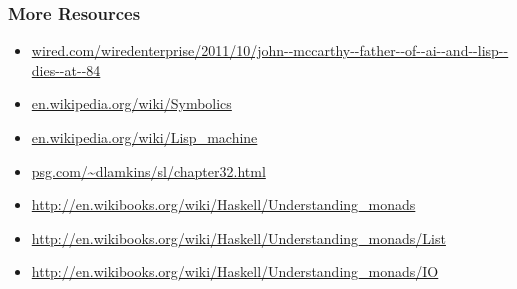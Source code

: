 \documentclass[]{beamer}
\begin{document}
\begin{frame}[fragile]
  \frametitle{More Resources}

  \begin{itemize}    
  \item \url{wired.com/wiredenterprise/2011/10/john--mccarthy--father--of--ai--and--lisp--dies--at--84}
  \item \url{en.wikipedia.org/wiki/Symbolics}
  \item \url{en.wikipedia.org/wiki/Lisp_machine}
  \item \url{psg.com/~dlamkins/sl/chapter32.html}
  \item \url{http://en.wikibooks.org/wiki/Haskell/Understanding_monads}
  \item \url{http://en.wikibooks.org/wiki/Haskell/Understanding_monads/List}
  \item \url{http://en.wikibooks.org/wiki/Haskell/Understanding_monads/IO}
  \end{itemize}

\end{frame}
\end{document}
